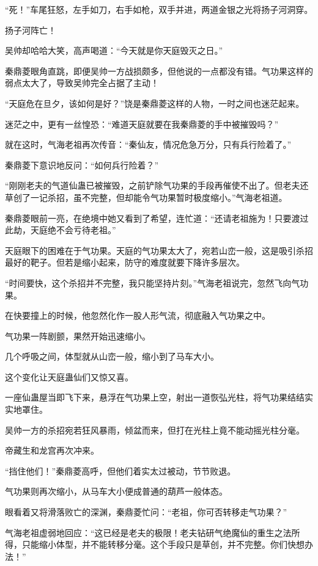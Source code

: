 \begin{this_body}
“死！”车尾狂怒，左手如刀，右手如枪，双手并进，两道金银之光将扬子河洞穿。

扬子河阵亡！

吴帅却哈哈大笑，高声喝道：“今天就是你天庭毁灭之日。”

秦鼎菱眼角直跳，即便吴帅一方战损颇多，但他说的一点都没有错。气功果这样的弱点太大了，导致吴帅完全占据了主动！

“天庭危在旦夕，该如何是好？”饶是秦鼎菱这样的人物，一时之间也迷茫起来。

迷茫之中，更有一丝惶恐：“难道天庭就要在我秦鼎菱的手中被摧毁吗？”

就在这时，气海老祖再次传音：“秦仙友，情况危急万分，只有兵行险着了。”

秦鼎菱下意识地反问：“如何兵行险着？”

“刚刚老夫的气道仙蛊已被摧毁，之前铲除气功果的手段再催使不出了。但老夫还草创了一记杀招，虽不完整，但却能令气功果暂时极度缩小。”气海老祖道。

秦鼎菱眼前一亮，在绝境中她又看到了希望，连忙道：“还请老祖施为！只要渡过此劫，天庭绝不会亏待老祖。”

天庭眼下的困难在于气功果。天庭的气功果太大了，宛若山峦一般，这是吸引杀招最好的靶子。但若是缩小起来，防守的难度就要下降许多层次。

“时间要快，这个杀招并不完整，我只能坚持片刻。”气海老祖说完，忽然飞向气功果。

在快要撞上的时候，他忽然化作一股人形气流，彻底融入气功果之中。

气功果一阵剧颤，果然开始迅速缩小。

几个呼吸之间，体型就从山峦一般，缩小到了马车大小。

这个变化让天庭蛊仙们又惊又喜。

一座仙蛊屋当即飞下来，悬浮在气功果上空，射出一道恢弘光柱，将气功果结结实实地罩住。

吴帅一方的杀招宛若狂风暴雨，倾盆而来，但打在光柱上竟不能动摇光柱分毫。

帝藏生和龙宫再次冲来。

“挡住他们！”秦鼎菱高呼，但他们着实太过被动，节节败退。

气功果则再次缩小，从马车大小便成普通的葫芦一般体态。

眼看着又将滑落败亡的深渊，秦鼎菱忙问：“老祖，你可否转移走气功果？”

气海老祖虚弱地回应：“这已经是老夫的极限！老夫钻研气绝魔仙的重生之法所得，只能缩小体型，并不能转移分毫。这个手段只是草创，并不完整。你们快想办法！”


\end{this_body}
